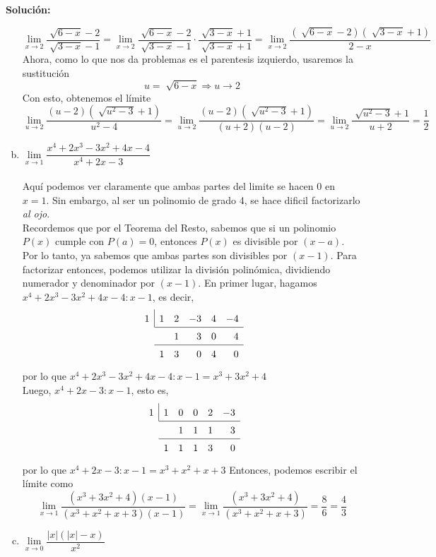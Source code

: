 \documentclass[12pt]{article}
\newenvironment{solucion}
{\begin{mdframed}[backgroundcolor=black!10]
		{\bf Solución:}\\
	}
	{
	\end{mdframed}
}
\newenvironment{preguntas}
{\begin{enumerate}\itemsep12pt
	}
	{
	\end{enumerate}
}
\newcommand{\ra}{\rightarrow}
\begin{document}
\begin{preguntas}
\begin{solucion}
\begin{enumerate}[a)]
$$\lim\limits_{x \ra 2} \dfrac{\sqrt[]{6-x}-2}{\sqrt[]{3-x}-1}
=\lim\limits_{x \ra 2} \dfrac{\sqrt[]{6-x}-2}{\sqrt[]{3-x}-1} \cdot \dfrac{\sqrt[]{3-x}+1}{\sqrt[]{3-x}+1} 
=\lim\limits_{x \ra 2} \dfrac{(\sqrt[]{6-x}-2)(\sqrt[]{3-x}+1)}{2-x} $$
Ahora, como lo que nos da problemas es el parentesis izquierdo, usaremos la sustitución
$$u = \sqrt[]{6-x} \Longrightarrow u \ra 2$$
Con esto, obtenemos el límite
$$\lim\limits_{u \ra 2} \dfrac{(u-2)(\sqrt[]{u^2-3}+1)}{u^2-4} 
=\lim\limits_{u \ra 2} \dfrac{(u-2)(\sqrt[]{u^2-3}+1)}{(u+2)(u-2)} 
=\lim\limits_{u \ra 2} \dfrac{\sqrt[]{u^2-3}+1}{u+2}
=\dfrac{1}{2}$$
\item $\lim\limits_{x \ra 1} \dfrac{x^4+2x^3-3x^2+4x-4}{x^4+2x-3}$\\
\\
Aquí podemos ver claramente que ambas partes del limite se hacen 0 en $x=1$. Sin embargo, al ser un polinomio de grado 4, se hace dificil factorizarlo \textit{al ojo}.\\
Recordemos que por el Teorema del Resto, sabemos que si un polinomio $P(x)$ cumple con $P(a) = 0$, entonces $P(x)$ es divisible por $(x-a)$. Por lo tanto, ya sabemos que ambas partes son divisibles por $(x-1)$. Para factorizar entonces, podemos utilizar la división polinómica, dividiendo numerador y denominador por $(x-1)$.
En primer lugar, hagamos $x^4+2x^3-3x^2+4x-4 : x-1$, es decir,
\[
\renewcommand\arraystretch{1.5}
\setlength\doublerulesep{0pt}
\begin{array}{rrrrrr}
\multicolumn{1}{r|}{1} & 1 & 2 & -3 & 4 & -4\\\cline{2-6}
& & 1& 3 & 0 & 4\\\cline{2-6}
& 1 & 3& 0 & 4 & 0
\end{array}
\]
por lo que $x^4+2x^3-3x^2+4x-4 : x-1 = x^3+3x^2+4$\\
Luego, $x^4+2x-3 : x-1$, esto es,
\[
\renewcommand\arraystretch{1.5}
\setlength\doublerulesep{0pt}
\begin{array}{rrrrrr}
\multicolumn{1}{r|}{1} & 1 & 0 & 0 & 2 & -3\\\cline{2-6}
& & 1& 1 & 1 & 3\\\cline{2-6}
& 1 & 1& 1 & 3 & 0
\end{array}
\]
por lo que $x^4+2x-3 : x-1 = x^3+x^2+x+3$
Entonces, podemos escribir el límite como
$$\lim\limits_{x \ra 1} \dfrac{(x^3+3x^2+4)(x-1)}{(x^3+x^2+x+3)(x-1)}
= \lim\limits_{x \ra 1} \dfrac{(x^3+3x^2+4)}{(x^3+x^2+x+3)}
= \dfrac{8}{6} = \dfrac{4}{3}$$
\item $\lim\limits_{x \ra 0} \dfrac{|x|(|x|-x)}{x^2}$\\

\end{enumerate}
\end{solucion}
\end{preguntas}
\end{document}
